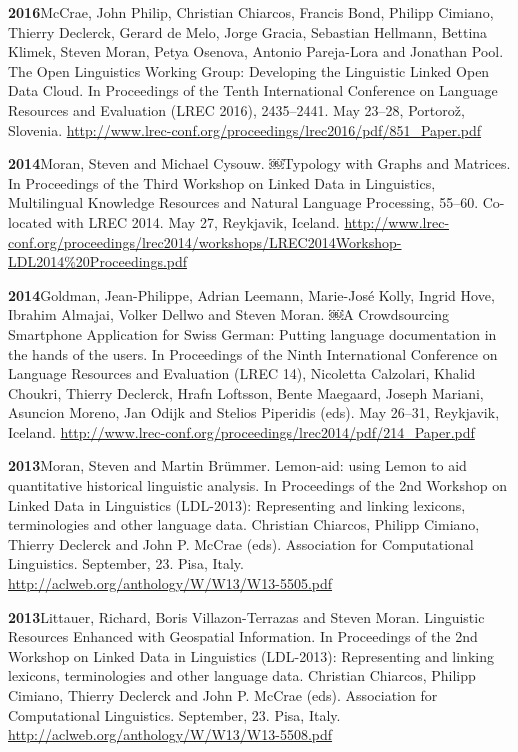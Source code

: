 \documentclass[11pt]{article}
\newcommand{\hangpara}{
 \setlength{\parindent}{0in} %
 \hangindent=0.42in %
}
\begin{document}
\vskip 6pt
\hangpara
{\bf 2016}\hspace{1ex}McCrae, John Philip, Christian Chiarcos, Francis Bond, Philipp Cimiano, Thierry Declerck, Gerard de Melo, Jorge Gracia, Sebastian Hellmann, Bettina Klimek, Steven Moran, Petya Osenova, Antonio Pareja-Lora and Jonathan Pool. The Open Linguistics Working Group: Developing the Linguistic Linked Open Data Cloud. In Proceedings of the Tenth International Conference on Language Resources and Evaluation (LREC 2016), 2435--2441. May 23--28, Portoro{\v z}, Slovenia. \url{http://www.lrec-conf.org/proceedings/lrec2016/pdf/851\_Paper.pdf}

\vskip 6pt
\hangpara
{\bf 2014}\hspace{1ex}Moran, Steven and Michael Cysouw. ￼Typology with Graphs and Matrices. In Proceedings of the Third Workshop on Linked Data in Linguistics, Multilingual Knowledge Resources and Natural Language Processing, 55--60. Co-located with LREC 2014. May 27, Reykjavik, Iceland. \url{http://www.lrec-conf.org/proceedings/lrec2014/workshops/LREC2014Workshop-LDL2014\%20Proceedings.pdf}

\vskip 6pt
\hangpara
{\bf 2014}\hspace{1ex}Goldman, Jean-Philippe, Adrian Leemann, Marie-Jos{\'e} Kolly, Ingrid Hove, Ibrahim Almajai, Volker Dellwo and Steven Moran. ￼A Crowdsourcing Smartphone Application for Swiss German: Putting language documentation in the hands of the users. In Proceedings of the Ninth International Conference on Language Resources and Evaluation (LREC 14), Nicoletta Calzolari, Khalid Choukri, Thierry Declerck, Hrafn Loftsson, Bente Maegaard, Joseph Mariani, Asuncion Moreno, Jan Odijk and Stelios Piperidis (eds). May 26--31, Reykjavik, Iceland. \url{http://www.lrec-conf.org/proceedings/lrec2014/pdf/214_Paper.pdf}

\vskip 6pt
\hangpara
{\bf 2013}\hspace{1ex}Moran, Steven and Martin Br{\"u}mmer. Lemon-aid: using Lemon to aid quantitative historical linguistic analysis. In Proceedings of the 2nd Workshop on Linked Data in Linguistics (LDL-2013): Representing and linking lexicons, terminologies and other language data. Christian Chiarcos, Philipp Cimiano, Thierry Declerck and John P. McCrae (eds). Association for Computational Linguistics. September, 23. Pisa, Italy. \url{http://aclweb.org/anthology/W/W13/W13-5505.pdf}

\vskip 6pt
\hangpara
{\bf 2013}\hspace{1ex}Littauer, Richard, Boris Villazon-Terrazas and Steven Moran. Linguistic Resources Enhanced with Geospatial Information. In Proceedings of the 2nd Workshop on Linked Data in Linguistics (LDL-2013): Representing and linking lexicons, terminologies and other language data. Christian Chiarcos, Philipp Cimiano, Thierry Declerck and John P. McCrae (eds). Association for Computational Linguistics. September, 23. Pisa, Italy. \url{http://aclweb.org/anthology/W/W13/W13-5508.pdf}
\end{document}
